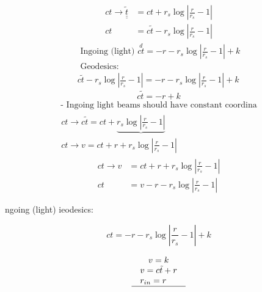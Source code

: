 \begin{equation}
    \begin{aligned}
        c t \rightarrow \underline{\underline{\tilde{t}}} & =c t+r_s \log \left|\frac{r}{r_s}-1\right|         \\
        c t                                               & =c \tilde{t}-r_s \log \left|\frac{r}{r_s}-1\right|
    \end{aligned}
\end{equation}
\begin{equation}
    \begin{array}{l}
        \text { Ingoing (light) } \stackrel{d}{c t}=-r-r_s \log \left|\frac{r}{r_s}-1\right|+k \\
        \text { Geodesics: }                                                                   \\
        c \tilde{t}-r_s \log \left|\frac{r}{r_s}-1\right|=-r-r_s \log \left|\frac{r}{r_s}-1\right|+k
    \end{array}
\end{equation}
\begin{equation}
    c \tilde{t}=-r+k
\end{equation}
\begin{equation}
    \begin{array}{l}
        \text { - Ingoing light beams should have constant coordina } \\
        \begin{array}{c}
            c t \rightarrow c \tilde{t}=c t+\underbrace{r_s \log \left|\frac{r}{r_s}-1\right|} \\
            c t \rightarrow v=c t+r+r_s \log \left|\frac{r}{r_s}-1\right|
        \end{array}
    \end{array}
\end{equation}
$$
    \begin{aligned}
        c t \rightarrow v & =c t+r+r_s \log \left|\frac{r}{r_s}-1\right| \\
        c t               & =v-r-r_s \log \left|\frac{r}{r_s}-1\right|
    \end{aligned}
$$

ngoing (light) ieodesics:

$$
    c t=-r-r_s \log \left|\frac{r}{r_s}-1\right|+k
$$

\begin{equation}
    \begin{array}{c}
        v=k             \\
        \begin{array}{l}
            v=c \tilde{t}+r \\
            r_{i n}=r
        \end{array} \\
        \hline
    \end{array}
\end{equation}

